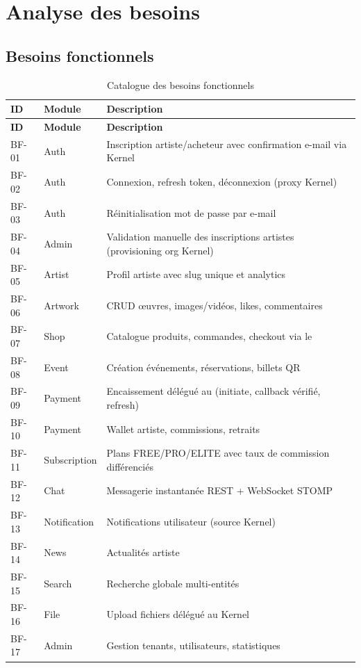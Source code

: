 \chapter{Analyse des besoins}

\section{Besoins fonctionnels}

\begin{longtable}{@{}p{1.2cm}p{4.5cm}p{8cm}@{}}
  \caption{Catalogue des besoins fonctionnels} \label{tab:bf} \\
  \toprule
  \textbf{ID} & \textbf{Module} & \textbf{Description} \\
  \midrule
  \endfirsthead
  \toprule
  \textbf{ID} & \textbf{Module} & \textbf{Description} \\
  \midrule
  \endhead
  BF-01 & Auth & Inscription artiste/acheteur avec confirmation e-mail via Kernel \\
  BF-02 & Auth & Connexion, refresh token, déconnexion (proxy Kernel) \\
  BF-03 & Auth & Réinitialisation mot de passe par e-mail \\
  BF-04 & Admin & Validation manuelle des inscriptions artistes (provisioning org Kernel) \\
  BF-05 & Artist & Profil artiste avec slug unique et analytics \\
  BF-06 & Artwork & CRUD œuvres, images/vidéos, likes, commentaires \\
  BF-07 & Shop & Catalogue produits, commandes, checkout via le  \\
  BF-08 & Event & Création événements, réservations, billets QR \\
  BF-09 & Payment & Encaissement délégué au  (initiate, callback vérifié, refresh) \\
  BF-10 & Payment & Wallet artiste, commissions, retraits \\
  BF-11 & Subscription & Plans FREE/PRO/ELITE avec taux de commission différenciés \\
  BF-12 & Chat & Messagerie instantanée REST + WebSocket STOMP \\
  BF-13 & Notification & Notifications utilisateur (source Kernel) \\
  BF-14 & News & Actualités artiste \\
  BF-15 & Search & Recherche globale multi-entités \\
  BF-16 & File & Upload fichiers délégué au Kernel \\
  BF-17 & Admin & Gestion tenants, utilisateurs, statistiques \\
  \bottomrule
\end{longtable}

